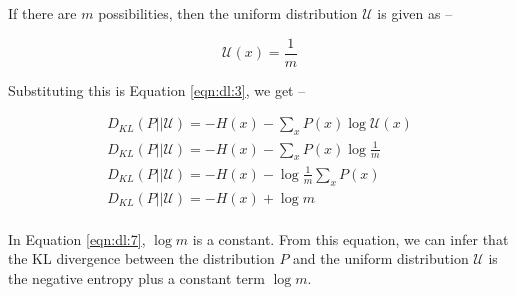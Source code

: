 \documentclass{article}
\begin{document}
If there are $m$ possibilities, then the uniform distribution $\mathcal{U}$ is given as --

\begin{equation}
\mathcal{U}(x) = \frac{1}{m}
\end{equation}

Substituting this is Equation \ref{eqn:dl:3}, we get --

\begin{align}
D_{KL}(P || \mathcal{U}) = -H(x) - \sum_{x}P(x)\log \mathcal{U}(x) \label{eqn:dl:4} \\
D_{KL}(P || \mathcal{U}) = -H(x) - \sum_{x}P(x)\log \frac{1}{m} \label{eqn:dl:5} \\
D_{KL}(P || \mathcal{U}) = -H(x) - \log \frac{1}{m}\sum_{x}P(x) \label{eqn:dl:6} \\
D_{KL}(P || \mathcal{U}) = -H(x) + \log m \label{eqn:dl:7} \\
\end{align}

In Equation \ref{eqn:dl:7}, $\log m$ is a constant. From this equation, we can infer that the KL divergence between the distribution $P$ and the uniform distribution $\mathcal{U}$ is the negative entropy plus a constant term $\log m$.
\end{document}

